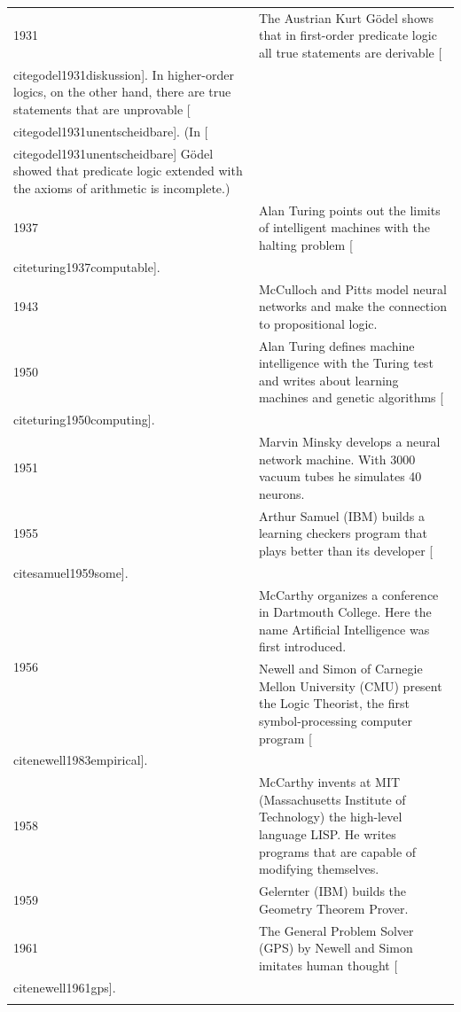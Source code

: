 \documentclass[10pt]{book}
\begin{document}
\begin{center}
\begin{tabular}{|l|l|}
\hline
1931 & The Austrian Kurt Gödel shows that in first-order predicate logic all true statements are derivable [\\cite{godel1931diskussion}]. In higher-order logics, on the other hand, there are true statements that are unprovable [\\cite{godel1931unentscheidbare}]. (In [\\cite{godel1931unentscheidbare}] Gödel showed that predicate logic extended with the axioms of arithmetic is incomplete.) \\
\hline
1937 & Alan Turing points out the limits of intelligent machines with the halting problem [\\cite{turing1937computable}]. \\
\hline
1943 & McCulloch and Pitts model neural networks and make the connection to propositional logic. \\
\hline
1950 & Alan Turing defines machine intelligence with the Turing test and writes about learning machines and genetic algorithms [\\cite{turing1950computing}]. \\
\hline
1951 & Marvin Minsky develops a neural network machine. With 3000 vacuum tubes he simulates 40 neurons. \\
\hline
1955 & Arthur Samuel (IBM) builds a learning checkers program that plays better than its developer [\\cite{samuel1959some}]. \\
\hline
\multirow[t]{2}{*}{1956} & McCarthy organizes a conference in Dartmouth College. Here the name Artificial Intelligence was first introduced. \\\index{Car}\index{Robot!car}
\hline
 & Newell and Simon of Carnegie Mellon University (CMU) present the Logic Theorist, the first symbol-processing computer program [\\cite{newell1983empirical}]. \\
\hline
1958 & McCarthy invents at MIT (Massachusetts Institute of Technology) the high-level language LISP. He writes programs that are capable of modifying themselves. \\
\hline
1959 & Gelernter (IBM) builds the Geometry Theorem Prover. \\
\hline
1961 & The General Problem Solver (GPS) by Newell and Simon imitates human thought [\\cite{newell1961gps}]. \\\index{Minimum cash reserve ratio}\index{Sustainability}

\end{tabular}
\end{center}
\end{document}
